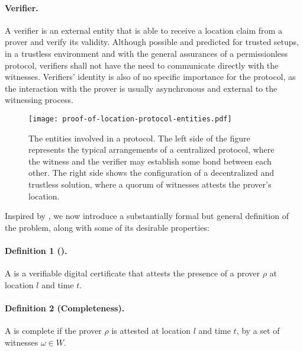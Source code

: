 \paragraph{Verifier.} A verifier is an external entity that is able to receive a location claim from a prover and verify its validity. Although possible and predicted for trusted setups, in a trustless environment and with the general assurances of a permissionless protocol, verifiers shall not have the need to communicate directly with the witnesses. Verifiers' identity is also of no specific importance for the protocol, as the interaction with the prover is usually asynchronous and external to the witnessing process.

\begin{figure}[ht]
    \begin{center}
    \texttt{[image: proof-of-location-protocol-entities.pdf]}
    \caption{The entities involved in a \pol{} protocol. The left side of the figure represents the typical arrangements of a centralized protocol, where the witness and the verifier may establish some bond between each other. The right side shows the configuration of a decentralized and trustless solution, where a quorum of witnesses attests the prover's location.}
    \label{fig:proof-of-location-protocol-entities}
    \end{center}
\end{figure}

Inspired by \cite{nasrulin2018robust, dupin2018location}, we now introduce a substantially formal but general definition of the \pol{} problem, along with some of its desirable properties:

\paragraph{Definition 1 (\pol{}).} A \pol{} is a verifiable digital certificate that attests the presence of a prover $\rho$ at location $l$ and time $t$.

\paragraph{Definition 2 (Completeness).} A \pol{} is complete if the prover $\rho$ is attested at location $l$ and time $t$, by a set of witnesses $\omega \in W$.

